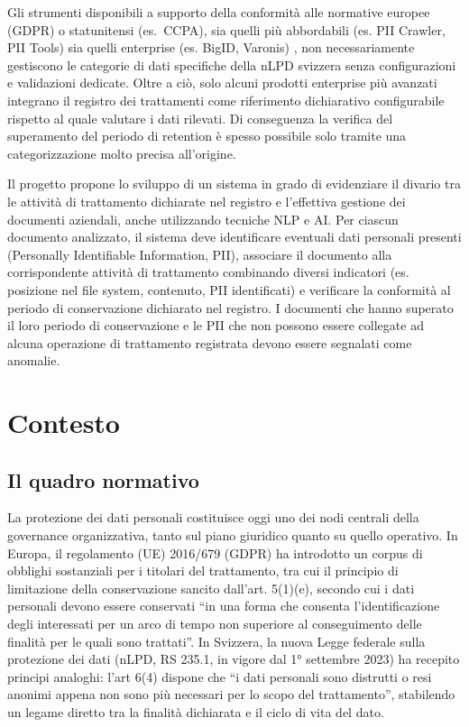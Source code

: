 Gli strumenti disponibili a supporto della conformità alle normative europee (GDPR) o statunitensi (es.\ CCPA), sia quelli più abbordabili (es. PII Crawler, PII Tools) sia quelli enterprise (es. BigID, Varonis) \cite{BigIDPrivacySuite, OverviewVaronisAIPowereda, PIIToolsDiscover}, non necessariamente gestiscono le categorie di dati specifiche della nLPD svizzera senza configurazioni e validazioni dedicate. Oltre a ciò, solo alcuni prodotti enterprise più avanzati integrano il registro dei trattamenti come riferimento dichiarativo configurabile rispetto al quale valutare i dati rilevati. Di conseguenza la verifica del superamento del periodo di retention è spesso possibile solo tramite una categorizzazione molto precisa all'origine.

Il progetto propone lo sviluppo di un sistema in grado di evidenziare il divario tra le attività di trattamento dichiarate nel registro e l’effettiva gestione dei documenti aziendali, anche utilizzando tecniche NLP e AI. Per ciascun documento analizzato, il sistema deve identificare eventuali dati personali presenti (Personally Identifiable Information, PII), associare il documento alla corrispondente attività di trattamento combinando diversi indicatori (es. posizione nel file system, contenuto, PII identificati) e verificare la conformità al periodo di conservazione dichiarato nel registro. I documenti che hanno superato il loro periodo di conservazione e le PII \cite{radackProtectingPersonallyIdentifiable} che non possono essere collegate ad alcuna operazione di trattamento registrata devono essere segnalati come anomalie.

\section{Contesto}
\label{sec:contesto}

\subsection{Il quadro normativo}
\label{sub:quadro-normativo}
La protezione dei dati personali costituisce oggi uno dei nodi centrali della governance organizzativa, tanto sul piano giuridico quanto su quello operativo. In Europa, il regolamento (UE) 2016/679 (GDPR) \cite{RegolamentoUE20162016} ha introdotto un corpus di obblighi sostanziali per i titolari del trattamento, tra cui il principio di limitazione della conservazione sancito dall’art. 5(1)(e), secondo cui i dati personali devono essere conservati “in una forma che consenta l’identificazione degli interessati per un arco di tempo non superiore al conseguimento delle finalità per le quali sono trattati”. In Svizzera, la nuova Legge federale sulla protezione dei dati (nLPD, RS 235.1, in vigore dal 1° settembre 2023) ha recepito principi analoghi: l’art 6(4) dispone che “i dati personali sono distrutti o resi anonimi appena non sono più necessari per lo scopo del trattamento”, stabilendo un legame diretto tra la finalità dichiarata e il ciclo di vita del dato.

